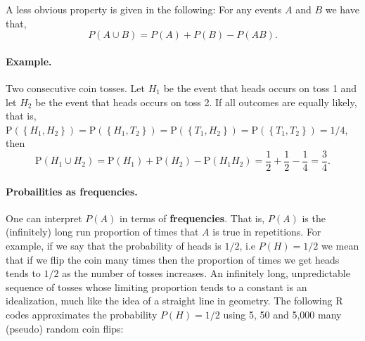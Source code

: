 \documentclass[
  14pt,
]{memoir}
\begin{document}
A less obvious property is given in the following: For any events \(A\) and \(B\) we have that,
\[P(A \cup B)=P(A)+P(B)-P(A B).\]

\paragraph*{Example.}

Two consecutive coin tosses. Let \(H_{1}\) be the event that heads occurs on toss 1 and let \(H_{2}\) be the event that heads occurs on toss 2. If all outcomes are equally likely, that is, \(\mathrm{P}\left(\left\{H_{1}, H_{2}\right\}\right)=\mathrm{P}\left(\left\{H_{1}, T_{2}\right\}\right)=\mathrm{P}\left(\left\{T_{1}, H_{2}\right\}\right)=\mathrm{P}\left(\left\{T_{1}, T_{2}\right\}\right)=1 / 4\), then
\[
\mathrm{P}\left(H_{1} \cup H_{2}\right)=\mathrm{P}\left(H_{1}\right)+\mathrm{P}\left(H_{2}\right)-\mathrm{P}\left(H_{1} H_{2}\right)=\frac{1}{2}+\frac{1}{2}-\frac{1}{4}=\frac{3}{4}.
\]

\bigskip

\paragraph*{Probailities as frequencies.}

One can interpret \(P(A)\) in terms of \textbf{frequencies}. That is, \(P(A)\) is the (infinitely) long run proportion of times that \(A\) is true in repetitions. For example, if we say that the probability of heads is \(1 / 2\), i.e \(P(H)=1/2\) we mean that if we flip the coin many times then the proportion of times we get heads tends to \(1 / 2\) as the number of tosses increases. An infinitely long, unpredictable sequence of tosses whose limiting proportion tends to a constant is an idealization, much like the idea of a straight line in geometry. \newline
The following \textsf{R} codes approximates the probability \(P(H)=1/2\) using 5, 50 and 5,000 many (pseudo) random coin flips:
\end{document}
